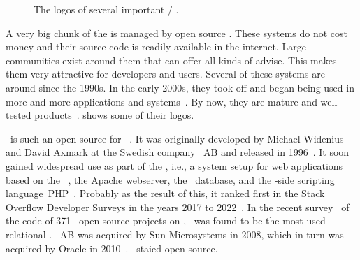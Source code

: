 \begin{figure}%
\centering%
\begin{noglslink}
%
%
%
\floatSep%
%
%
%
\floatSep%
%
%
%
\floatRowSep%
%
%
%
\caption{The logos of several important  / .}%
\label{fig:ossDBlogos}%
\end{noglslink}%
\end{figure}%
%
A very big chunk of the  is managed by open source .
These systems do not cost money and their source code is readily available in the internet.
Large communities exist around them that can offer all kinds of advise.
This makes them very attractive for developers and users.
Several of these systems are around since the 1990s.
In the early 2000s, they took off and began being used in more and more applications and systems~\cite{P2004OSDMITM}.
By now, they are mature and well-tested products~\cite{C20245YOQ}.
 shows some of their logos.

\mysql\ is such an open source  for ~\cite{WAM2002MRMDFTS,TA2024DDAMWPAM,BT2021HPM,RGS2021BTOTONAMDFPC,D2015LMAM}.
It was originally developed by Michael Widenius and David Axmark at the Swedish company \mysql~AB and released in 1996~\cite{C20245YOQ}.
It soon gained widespread use as part of the \lampStack, i.e., a system setup for web applications based on the \linux\ , the Apache webserver, the \mysql\ database, and the -side scripting language~PHP~\cite{C2022HAFTLS,H2020ULU2E}.
Probably as the result of this, it ranked first in the Stack Overflow Developer Surveys in the years 2017 to 2022~\cite{SE:SO:2024DS}.
In the recent survey~\cite{PMPVEPWGSMB2025ATAODMSTTHOOSP} of the code of 371~ open source projects on \github, \mysql\ was found to be the most-used relational .
\mysql~AB was acquired by Sun Microsystems in 2008, which in turn was acquired by Oracle in 2010~\cite{C20245YOQ}.
\mysql\ staied open source.

